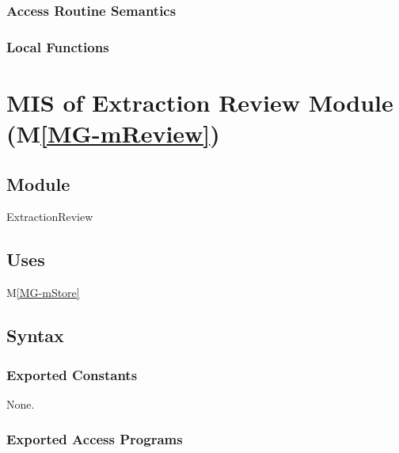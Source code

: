 \documentclass[12pt, titlepage]{article}
\newcommand{\mref}[1]{M\ref{MG-#1}}
\begin{document}

\subsubsection{Access Routine Semantics}


\subsubsection{Local Functions}



\newpage

\section{MIS of Extraction Review Module (\mref{mReview})} \label{mis-mReview}

\subsection{Module}

ExtractionReview

\subsection{Uses}

\mref{mStore}

\subsection{Syntax}

\subsubsection{Exported Constants}

None.

\subsubsection{Exported Access Programs}
\end{document}
